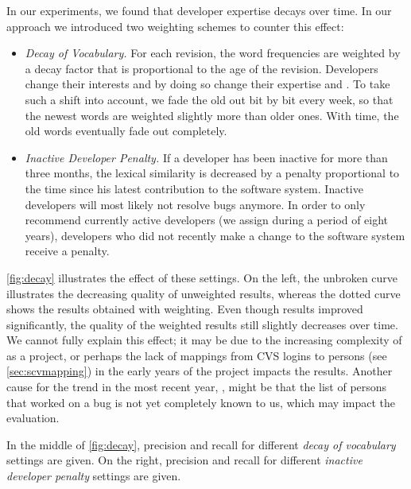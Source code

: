 \documentclass[10pt]{book}
\begin{document}
In our experiments, we found that developer expertise decays over time. In our approach we introduced two weighting schemes to counter this effect: 

\begin{itemize}
\item \emph{Decay of Vocabulary.} For each revision, the word frequencies are weighted by a decay factor that is proportional to the age of the revision. Developers change their interests and by doing so change their expertise and \VOC. To take such a shift into account, we fade the old \VOC out bit by bit every week, so that the newest words are weighted slightly more than older ones. With time, the old words eventually fade out completely.
\item \emph{Inactive Developer Penalty.} If a developer has been inactive for more than three months, the lexical similarity is decreased by a penalty proportional to the time since his latest contribution to the software system. Inactive developers will most likely not resolve bugs anymore. In order to only recommend currently active developers (we assign \BRs during a period of eight years), developers who did not recently make a change to the software system receive a penalty.
\end{itemize}

\noindent \autoref{fig:decay} illustrates the effect of these settings. On the left, the unbroken curve illustrates the decreasing quality of unweighted results, whereas the dotted curve shows the results obtained with weighting. Even though results improved significantly, the quality of the weighted results still slightly decreases over time. We cannot fully explain this effect; it may be due to the increasing complexity of \EC as a project, or perhaps the lack of mappings from CVS logins to persons (see \autoref{sec:scvmapping}) in the early years of the project impacts the results. Another cause for the trend in the most recent year, , might be that the list of persons that worked on a bug is not yet completely known to us, which may impact the evaluation.


In the middle of \autoref{fig:decay}, precision and recall for different \emph{decay of vocabulary} settings are given. On the right, precision and recall for different \emph{inactive developer penalty} settings are given. 
\end{document}
